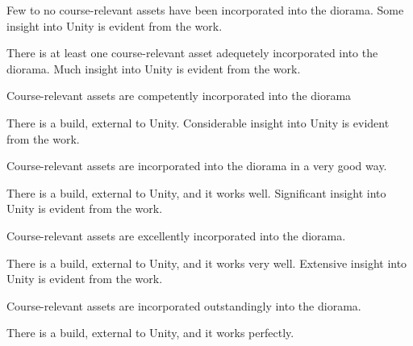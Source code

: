 \documentclass{../../fal_assignment}
\begin{document}
\begin{markingrubric}
            \par Few to no course-relevant assets have been incorporated into the diorama.
        \grade Some insight into Unity is evident from the work.
            \par There is at least one course-relevant asset adequetely incorporated into the diorama.
        \grade Much insight into Unity is evident from the work.
            \par Course-relevant assets are competently incorporated into the diorama
            \par There is a build, external to Unity.
        \grade Considerable insight into Unity is evident from the work.
            \par Course-relevant assets are incorporated into the diorama in a very good way.
            \par There is a build, external to Unity, and it works well.
        \grade Significant insight into Unity is evident from the work.
            \par Course-relevant assets are excellently incorporated into the diorama.
            \par There is a build, external to Unity, and it works very well.
        \grade Extensive insight into Unity is evident from the work.
            \par Course-relevant assets are incorporated outstandingly into the diorama.
            \par There is a build, external to Unity, and it works perfectly.
%
\end{markingrubric}
\end{document}
